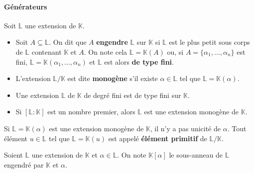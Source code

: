   \paragraph{Générateurs}


  \begin{definition}
    Soit $\mathbb{L}$ une extension de $\mathbb{K}$.
    \begin{itemize}
      \item Soit $A \subseteq \mathbb{L}$. On dit que $A$ \textbf{engendre} $\mathbb{L}$ sur $\mathbb{K}$ si $\mathbb{L}$ est le plus petit sous corps de $\mathbb{L}$ contenant $\mathbb{K}$ et $A$. On note cela $\mathbb{L} = \mathbb{K}(A)$ ou, si $A = \{ \alpha_1, \dots, \alpha_n \}$ est fini, $\mathbb{L} = \mathbb{K}(\alpha_1, \dots, \alpha_n)$ et $\mathbb{L}$ est alors \textbf{de type fini}.
      \item L'extension $\mathbb{L}/\mathbb{K}$ est dite \textbf{monogène} s'il existe $\alpha \in \mathbb{L}$ tel que $\mathbb{L} = \mathbb{K}(\alpha)$.
    \end{itemize}
  \end{definition}


  \begin{example}
    \begin{itemize}
      \item Une extension $\mathbb{L}$ de $\mathbb{K}$ de degré fini est de type fini sur $\mathbb{K}$.
      \item Si $[\mathbb{L}:\mathbb{K}]$ est un nombre premier, alors $\mathbb{L}$ est une extension monogène de $\mathbb{K}$.
    \end{itemize}
  \end{example}

  \begin{remark}
    Si $\mathbb{L} = \mathbb{K}(\alpha)$ est une extension monogène de $\mathbb{K}$, il n'y a pas unicité de $\alpha$. Tout élément $u \in \mathbb{L}$ tel que $\mathbb{L} = \mathbb{K}(u)$ est appelé \textbf{élément primitif} de $\mathbb{L}/\mathbb{K}$.
  \end{remark}


  \begin{definition}
    Soient $\mathbb{L}$ une extension de $\mathbb{K}$ et $\alpha \in \mathbb{L}$. On note $\mathbb{K}[\alpha]$ le sous-anneau de $\mathbb{L}$ engendré par $\mathbb{K}$ et $\alpha$.
  \end{definition}

